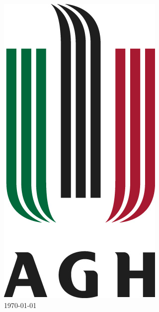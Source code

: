 \documentclass[a4paper, 11pt]{article}
\begin{document}
\begin{titlepage}
		\includegraphics[scale=0.25]{agh.jpg}\\[1cm]
		
		{\large \today}\\[3cm] %
		
		
		
		
		\vfill %
		
\end{titlepage}
	
\end{document}
